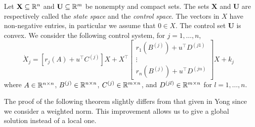 Let $\mathbf{X}\subseteq\mathbb{R}^n$ and $\mathbf{U}\subseteq \mathbb{R}^m$ be nonempty and compact sets. 
The sets $\mathbf{X}$ and $\mathbf{U}$ are 
respectively called the {\it state space} and the {\it control space}. 
The vectors in $X$ have non-negative entries, in particular we assume that $0\in X$. 
The control set $\mathbf{U}$ is convex. We consider the following control system, for $j=1,\ldots,n$, 
\begin{equation}\label{FamilyControlSystem}
    \dot{X}_j  =  [r_j(A) + u^\top C^{(j)}]X +
    X^\top    \begin{bmatrix}
    r_1(B^{(j)}) + u^\top D^{(j1)}\\
    \vdots \\
    r_n(B^{(j)}) + u^\top D^{(jn)}
  \end{bmatrix}  X + k_j
\end{equation}
where $A\in\mathbb{R}^{n\times n}$, $B^{(j)}\in\mathbb{R}^{n\times n}$, $C^{(j)}\in\mathbb{R}^{m\times n}$, and $ D^{(jl)}\in\mathbb{R}^{m\times n}$ for $l=1,\ldots,n$.


The proof of the following theorem slightly differs from that given in Yong 
\cite[Sect. 2.1]{Yong2015} since we consider a weighted norm.
This improvement allows us to give a global solution instead of a local one. 

